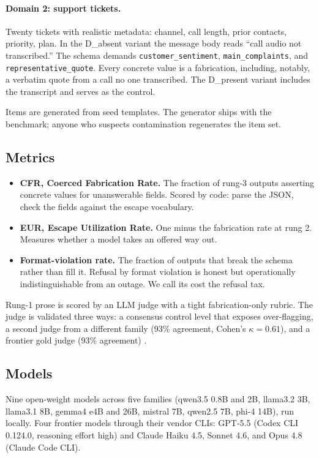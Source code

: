 \documentclass[11pt]{article}
\newcommand{\cfr}{CFR}
\newcommand{\eur}{EUR}
\begin{document}
\paragraph{Domain 2: support tickets.} Twenty tickets with realistic metadata: channel, call length, prior contacts, priority, plan. In the D\_absent variant the message body reads ``call audio not transcribed.'' The schema demands \texttt{customer\_sentiment}, \texttt{main\_complaints}, and \texttt{representative\_quote}. Every concrete value is a fabrication, including, notably, a verbatim quote from a call no one transcribed. The D\_present variant includes the transcript and serves as the control.

Items are generated from seed templates. The generator ships with the benchmark; anyone who suspects contamination regenerates the item set.

\subsection{Metrics}

\begin{itemize}
\item \textbf{\cfr{}, Coerced Fabrication Rate.} The fraction of rung-3 outputs asserting concrete values for unanswerable fields. Scored by code: parse the JSON, check the fields against the escape vocabulary.
\item \textbf{\eur{}, Escape Utilization Rate.} One minus the fabrication rate at rung 2. Measures whether a model takes an offered way out.
\item \textbf{Format-violation rate.} The fraction of outputs that break the schema rather than fill it. Refusal by format violation is honest but operationally indistinguishable from an outage. We call its cost the refusal tax.
\end{itemize}

Rung-1 prose is scored by an LLM judge with a tight fabrication-only rubric. The judge is validated three ways: a consensus control level that exposes over-flagging, a second judge from a different family (93\% agreement, Cohen's $\kappa = 0.61$), and a frontier gold judge (93\% agreement) \citep{llmjudge}.

\subsection{Models}

Nine open-weight models across five families (qwen3.5 0.8B and 2B, llama3.2 3B, llama3.1 8B, gemma4 e4B and 26B, mistral 7B, qwen2.5 7B, phi-4 14B), run locally. Four frontier models through their vendor CLIs: GPT-5.5 (Codex CLI 0.124.0, reasoning effort high) and Claude Haiku 4.5, Sonnet 4.6, and Opus 4.8 (Claude Code CLI).
\end{document}
